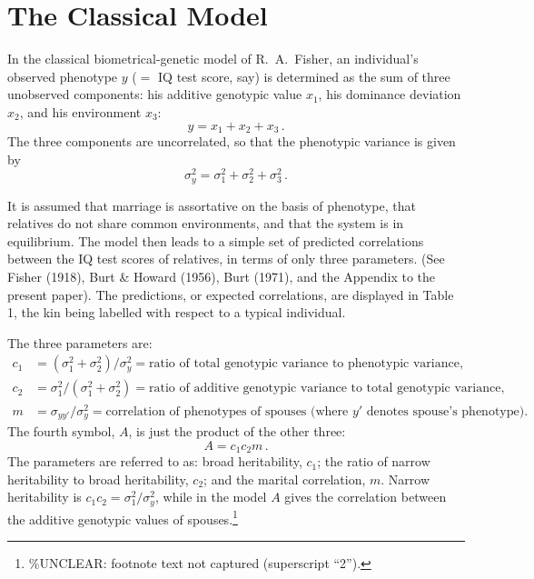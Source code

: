 ﻿\documentclass[12pt]{article}
\begin{document}
\section{The Classical Model}

In the classical biometrical-genetic model of R.\ A.\ Fisher, an individual's observed phenotype $y$ ($=$ IQ test score, say) is determined as the sum of three unobserved components: his additive genotypic value $x_1$, his dominance deviation $x_2$, and his environment $x_3$:
\begin{equation*}
y = x_1 + x_2 + x_3 \, .
\end{equation*}
The three components are uncorrelated, so that the phenotypic variance is given by
\begin{equation*}
\sigma_y^2 = \sigma_1^2 + \sigma_2^2 + \sigma_3^2 \, .
\end{equation*}

It is assumed that marriage is assortative on the basis of phenotype, that relatives do not share common environments, and that the system is in equilibrium. The model then leads to a simple set of predicted correlations between the IQ test scores of relatives, in terms of only three parameters. (See Fisher (1918), Burt \& Howard (1956), Burt (1971), and the Appendix to the present paper). The predictions, or expected correlations, are displayed in Table 1, the kin being labelled with respect to a typical individual.

The three parameters are:
\begin{align*}
c_1 &= (\sigma_1^2 + \sigma_2^2)/\sigma_y^2 = \text{ratio of total genotypic variance to phenotypic variance,} \\
c_2 &= \sigma_1^2/(\sigma_1^2 + \sigma_2^2) = \text{ratio of additive genotypic variance to total genotypic variance,} \\
m &= \sigma_{yy'}/\sigma_y^2 = \text{correlation of phenotypes of spouses (where } y' \text{ denotes spouse's phenotype).}
\end{align*}
The fourth symbol, $A$, is just the product of the other three:
\begin{equation*}
A = c_1 c_2 m \, .
\end{equation*}
The parameters are referred to as: broad heritability, $c_1$; the ratio of narrow heritability to broad heritability, $c_2$; and the marital correlation, $m$. Narrow heritability is $c_1 c_2 = \sigma_1^2/\sigma_y^2$, while in the model $A$ gives the correlation between the additive genotypic values of spouses.\footnote{\%UNCLEAR: footnote text not captured (superscript ``2'').}
\end{document}

